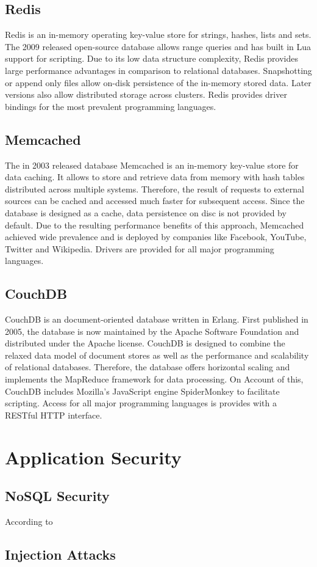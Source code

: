 \subsection{Redis}
Redis is an in-memory operating key-value store for strings, hashes, lists and sets. The 2009 released open-source database allows range queries and has built in Lua support for scripting. Due to its low data structure complexity, Redis provides large performance advantages in comparison to relational databases. Snapshotting or append only files allow on-disk persistence of the in-memory stored data. Later versions also allow distributed storage across clusters. Redis provides driver bindings for the most prevalent programming languages.

\subsection{Memcached}
The in 2003 released database Memcached is an in-memory key-value store for data caching. It allows to store and retrieve data from memory with hash tables distributed across multiple systems. Therefore, the result of requests to external sources can be cached and accessed much faster for subsequent access. Since the database is designed as a cache, data persistence on disc is not provided by default. Due to the resulting performance benefits of this approach, Memcached achieved wide prevalence and is deployed by companies like Facebook, YouTube, Twitter and Wikipedia. Drivers are provided for all major programming languages.


\subsection{CouchDB}
CouchDB is an document-oriented database written in Erlang. First published in 2005, the database is now maintained by the Apache Software Foundation and distributed under the Apache license. CouchDB is designed to combine the relaxed data model of document stores as well as the performance and scalability of relational databases. Therefore, the database offers horizontal scaling and implements the MapReduce framework for data processing. On Account of this, CouchDB includes Mozilla's JavaScript engine SpiderMonkey to facilitate scripting. Access for all major programming languages is provides with a RESTful HTTP interface. 

\section{Application Security}
\subsection{NoSQL Security}
According to 
\subsection{Injection Attacks}